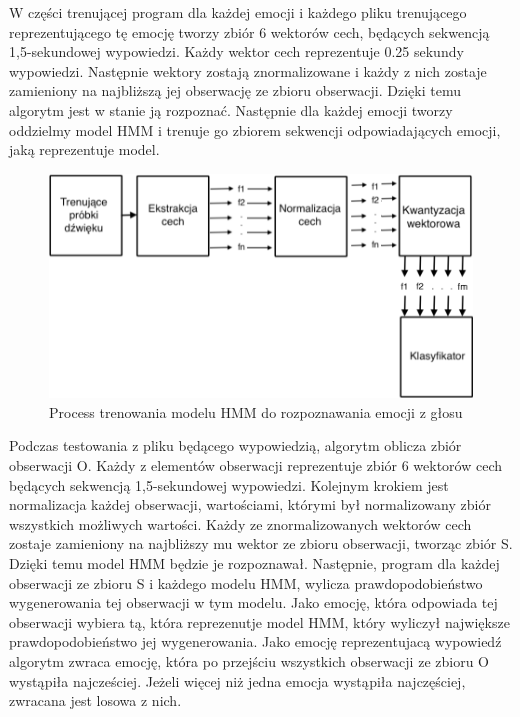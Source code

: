 \documentclass[declaration,shortabstract]{iithesis}
\begin{document}
W części trenującej program dla każdej emocji i każdego pliku trenującego reprezentującego tę emocję tworzy zbiór 6 wektorów cech, będących sekwencją 1,5-sekundowej wypowiedzi. Każdy wektor cech reprezentuje 0.25 sekundy wypowiedzi. Następnie wektory zostają znormalizowane i każdy z nich zostaje zamieniony na najbliższą jej obserwację ze zbioru obserwacji. Dzięki temu algorytm jest w stanie ją rozpoznać. Następnie dla każdej emocji tworzy oddzielmy model HMM i trenuje go zbiorem sekwencji odpowiadających emocji, jaką reprezentuje model.

\begin{figure}[!ht]
\hspace*{-5cm}  
	\caption{Process trenowania modelu HMM do rozpoznawania emocji z głosu}
	\includegraphics[scale=0.35]{hmm_train.png}
\end{figure}

Podczas testowania z pliku będącego wypowiedzią, algorytm oblicza zbiór obserwacji O. Każdy z elementów obserwacji reprezentuje zbiór 6 wektorów cech będących sekwencją 1,5-sekundowej wypowiedzi. Kolejnym krokiem jest normalizacja każdej obserwacji, wartościami, którymi był normalizowany zbiór wszystkich możliwych wartości. Każdy ze znormalizowanych wektorów cech zostaje zamieniony na najbliższy mu wektor ze zbioru obserwacji, tworząc zbiór S. Dzięki temu model HMM będzie je rozpoznawał. Następnie, program dla każdej obserwacji ze zbioru S i każdego modelu HMM, wylicza prawdopodobieństwo wygenerowania tej obserwacji w tym modelu. Jako emocję, która odpowiada tej obserwacji wybiera tą, która reprezenutje model HMM, który wyliczył największe prawdopodobieństwo jej wygenerowania. Jako emocję reprezentujacą wypowiedź algorytm zwraca emocję, która po przejściu wszystkich obserwacji ze zbioru O wystąpiła najcześciej. Jeżeli więcej niż jedna emocja wystąpiła najczęściej, zwracana jest losowa z nich.
\end{document}
